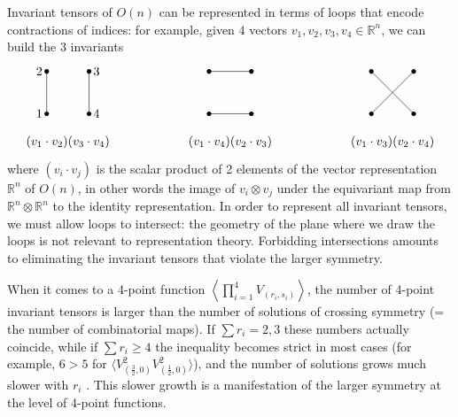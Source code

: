 \documentclass[12pt, a4paper]{article}
\newcommand{\vertices}{
\coordinate (base) at (0, 1);
\draw (0, 0) node[fill, circle, minimum size = 1.3mm, inner sep = 0]{};
  \draw (3, 0) node[fill, circle, minimum size = 1.3mm, inner sep = 0]{};
  \draw (0, 3) node[fill, circle, minimum size = 1.3mm, inner sep = 0]{};
  \draw (3, 3) node[fill, circle, minimum size = 1.3mm, inner sep = 0]{};
}
\theoremstyle{break}
\begin{document}
Invariant tensors of $O(n)$ can be represented in terms of loops that encode contractions of indices: for example, given 4 vectors $v_1,v_2,v_3,v_4\in \mathbb{R}^n$, we can build the 3 invariants 
\begin{align}
\begin{tikzpicture}[baseline=(base), scale = .4]
  \vertices
  \draw (0, 0) node [left]{$1$} -- (0, 3) node[left]{$2$};
  \draw (3, 0) node [right]{$4$} -- (3, 3) node[right]{$3$};
  \node at (1.5, -2) {$(v_1\cdot v_2)(v_3\cdot v_4)$};
 \end{tikzpicture}
 \hspace{2cm}
 \begin{tikzpicture}[baseline=(base), scale = .4]
  \vertices
 \draw (0, 3) -- (3, 3) ;
 \draw (0,0) -- (3,0);
 \node at (1.5, -2) {$(v_1\cdot v_4)(v_2\cdot v_3)$};
 \end{tikzpicture}
 \hspace{2cm}
 \begin{tikzpicture}[baseline=(base), scale = .4]
  \vertices
 \draw (0, 3) -- (3, 0) ;
  \draw (3, 3) -- (0, 0);
  \node at (1.5, -2) {$(v_1\cdot v_3)(v_2\cdot v_4)$};
 \end{tikzpicture}
\end{align}
where $(v_i\cdot v_j)$ is the scalar product of 2 elements of the vector representation $\mathbb{R}^n$ of $O(n)$, in other words the image of $v_i\otimes v_j$ under the equivariant map from $\mathbb{R}^n\otimes \mathbb{R}^n$ to the identity representation. In order to represent all invariant tensors, we must allow loops to intersect: the geometry of the plane where we draw the loops is not relevant to representation theory. Forbidding intersections amounts to eliminating the invariant tensors that violate the larger symmetry. 

When it comes to a 4-point function $\left<\prod_{i=1}^4 V_{(r_i,s_i)}\right>$, the number of 4-point invariant tensors is larger than the number of solutions of crossing symmetry (= the number of combinatorial maps). If $\sum r_i = 2, 3$ these numbers actually coincide, while if $\sum r_i\geq 4$ the inequality becomes strict in most cases (for example, $6>5$ for $\big\langle V_{(\frac32,0)}^2V_{(\frac12,0)}^2\big\rangle$), and the number of solutions grows much slower with $r_i$ \cite{gjnrs23}. This slower growth is a manifestation of the larger symmetry at the level of 4-point functions. 
\end{document}
